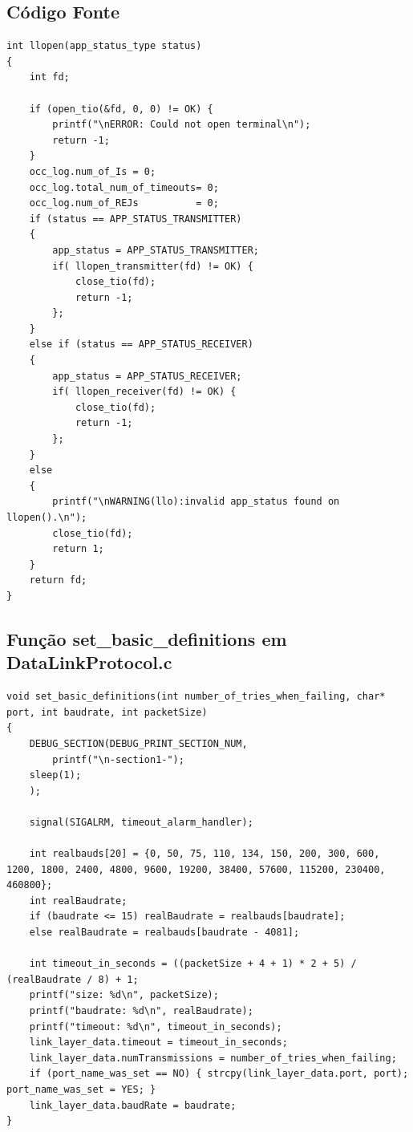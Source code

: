 \documentclass[11pt,a4paper,reqno]{report}
\numberwithin{equation}{section}
\begin{document}
\begin{appendices}

\chapter{Código Fonte}

\begin{lstlisting}
int llopen(app_status_type status)
{
	int fd;

	if (open_tio(&fd, 0, 0) != OK) {
		printf("\nERROR: Could not open terminal\n");
		return -1;
	}
	occ_log.num_of_Is = 0;
	occ_log.total_num_of_timeouts= 0;
	occ_log.num_of_REJs			 = 0;
	if (status == APP_STATUS_TRANSMITTER)
	{
		app_status = APP_STATUS_TRANSMITTER;
		if( llopen_transmitter(fd) != OK) {
			close_tio(fd);
			return -1;
		};
	}
	else if (status == APP_STATUS_RECEIVER)
	{
		app_status = APP_STATUS_RECEIVER;
		if( llopen_receiver(fd) != OK) {
			close_tio(fd);
			return -1;
		};
	}
	else
	{
		printf("\nWARNING(llo):invalid app_status found on llopen().\n");
		close_tio(fd);
		return 1;
	}
	return fd;
}
\end{lstlisting}

\section{Função set\_basic\_definitions em DataLinkProtocol.c}
\label{setbasicdefinitions}
\begin{lstlisting}
void set_basic_definitions(int number_of_tries_when_failing, char* port, int baudrate, int packetSize)
{
	DEBUG_SECTION(DEBUG_PRINT_SECTION_NUM,
		printf("\n-section1-");
	sleep(1);
	);

	signal(SIGALRM, timeout_alarm_handler);
	
	int realbauds[20] = {0, 50, 75, 110, 134, 150, 200, 300, 600, 1200, 1800, 2400, 4800, 9600, 19200, 38400, 57600, 115200, 230400, 460800};
	int realBaudrate;
	if (baudrate <= 15) realBaudrate = realbauds[baudrate];
	else realBaudrate = realbauds[baudrate - 4081];
	
	int timeout_in_seconds = ((packetSize + 4 + 1) * 2 + 5) / (realBaudrate / 8) + 1;
	printf("size: %d\n", packetSize);
	printf("baudrate: %d\n", realBaudrate);
	printf("timeout: %d\n", timeout_in_seconds);
	link_layer_data.timeout = timeout_in_seconds;
	link_layer_data.numTransmissions = number_of_tries_when_failing;
	if (port_name_was_set == NO) { strcpy(link_layer_data.port, port); port_name_was_set = YES; }
	link_layer_data.baudRate = baudrate;
}
\end{lstlisting}


\end{appendices}
\end{document}
